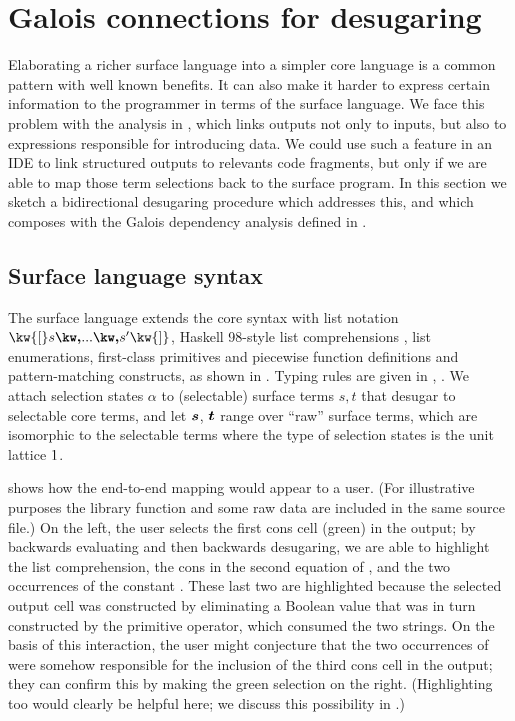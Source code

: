 \newpage
\section{Galois connections for desugaring}
\label{sec:surface-language}

Elaborating a richer surface language into a simpler core language is a common pattern with well known benefits. It can also make it harder to express certain information to the programmer in terms of the surface language. We face this problem with the analysis in , which links outputs not only to inputs, but also to expressions responsible for introducing data. We could use such a feature in an IDE to link structured outputs to relevants code fragments, but only if we are able to map those term selections back to the surface program. In this section we sketch a bidirectional desugaring procedure which addresses this, and which composes with the Galois dependency analysis defined in .



\subsection{Surface language syntax}

The surface language \OurLanguage{} extends the core syntax with list notation $\kw{[} s \comma \ldots \comma s' \kw{]}$, Haskell 98-style list comprehensions \cite{peytonJones03}, list enumerations, first-class primitives and piecewise function definitions and pattern-matching constructs, as shown in . Typing rules are \ifappendices given in , \else \IncludedWithSupplementaryMaterial\fi. We attach selection states $\alpha$ to (selectable) surface terms $s, t$ that desugar to selectable core terms, and let $\bm{s}$, $\bm{t}$ range over ``raw'' surface terms, which are isomorphic to the selectable terms where the type of selection states is the unit lattice $1$.

 shows how the end-to-end mapping would appear to a user. (For illustrative purposes the library function  and some raw data are included in the same source file.) On the left, the user selects the first cons cell (green) in the output; by backwards evaluating and then backwards desugaring, we are able to highlight the list comprehension, the cons in the second equation of , and the two occurrences of the constant . These last two are highlighted because the selected output cell was constructed by eliminating a Boolean value that was in turn constructed by the primitive \kw{==} operator, which consumed the two strings. On the basis of this interaction, the user might conjecture that the two occurrences of  were somehow responsible for the inclusion of the third cons cell in the output; they can confirm this by making the green selection on the right. (Highlighting \kw{==} too would clearly be helpful here; we discuss this possibility in .)

